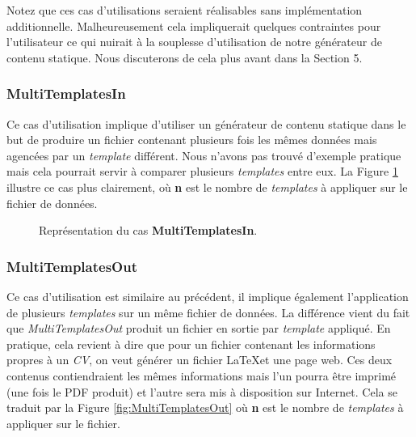 			 Notez que ces cas d'utilisations seraient réalisables sans implémentation additionnelle. Malheureusement cela impliquerait quelques contraintes pour l'utilisateur ce qui nuirait à la souplesse d'utilisation de notre générateur de contenu statique. Nous discuterons de cela plus avant dans la Section 5.
			
			\subsubsection*{MultiTemplatesIn}
				Ce cas d'utilisation implique  d'utiliser un générateur de contenu statique dans le but de produire un fichier contenant plusieurs fois les mêmes données mais agencées par un \textit{template} différent. Nous n'avons pas trouvé d'exemple pratique mais cela pourrait servir à comparer plusieurs \textit{templates} entre eux. La Figure \ref{fig:MultiTemplatesIn} illustre ce cas plus clairement, où \textbf{n} est le nombre de \textit{templates} à appliquer sur le fichier de données.
				
				\begin{figure}
					\begin{center}
						\caption{Représentation du cas \textbf{MultiTemplatesIn}.}
						\label{fig:MultiTemplatesIn}
					\end{center}
				\end{figure}
				
			
			\subsubsection*{MultiTemplatesOut}
				Ce cas d'utilisation est similaire au précédent, il implique également l'application de plusieurs \textit{templates} sur un même fichier de données. La différence vient du fait que \textit{MultiTemplatesOut} produit un fichier en sortie par \textit{template} appliqué. En pratique, cela revient à dire que pour un fichier contenant les informations propres à un \textit{CV}, on veut générer un fichier \LaTeX et une page web. Ces deux contenus contiendraient les mêmes informations mais l'un pourra être imprimé (une fois le PDF produit) et l'autre sera mis à disposition sur Internet. Cela se traduit par la Figure \ref{fig:MultiTemplatesOut} où \textbf{n} est le nombre de \textit{templates} à appliquer sur le fichier.
				
